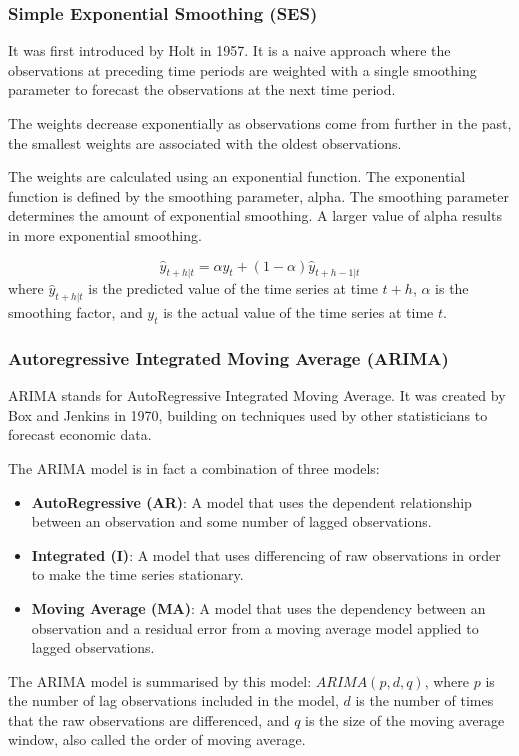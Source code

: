 \documentclass[manuscript,screen,nonacm,11pt]{acmart}
\numberwithin{equation}{section}
\begin{document}
\subsubsection{Simple Exponential Smoothing (SES)}
It was first introduced by Holt in 1957. It is a naive approach where the observations at
preceding time periods are weighted with a single smoothing parameter to forecast the
observations at the next time period.

The weights decrease exponentially as observations come from further in the past,
the smallest weights are associated with the oldest observations.

The weights are calculated using an exponential function. The exponential function is defined by
the smoothing parameter, alpha. The smoothing parameter determines the amount of exponential
smoothing. A larger value of alpha results in more exponential smoothing.

\begin{equation}
\label{eq:ses}
\hat{y}_{t+h|t} = \alpha y_t + (1-\alpha)\hat{y}_{t+h-1|t}
\end{equation}
where $\hat{y}_{t+h|t}$ is the predicted value of the time series at time $t+h$,
$\alpha$ is the smoothing factor, and $y_t$ is the actual value of the time series
at time $t$.

\subsubsection{Autoregressive Integrated Moving Average (ARIMA)}
ARIMA stands for AutoRegressive Integrated Moving Average. It was created by Box and Jenkins 
in 1970, building on techniques used by other statisticians to forecast economic data.

The ARIMA model is in fact a combination of three models:
\begin{itemize}
\item \textbf{AutoRegressive (AR)}: A model that uses the dependent relationship between an observation and some number of lagged observations.
\item \textbf{Integrated (I)}: A model that uses differencing of raw observations in order to make the time series stationary.
\item \textbf{Moving Average (MA)}: A model that uses the dependency between an observation and a residual error from a moving average model applied to lagged observations.
\end{itemize} 

The ARIMA model is summarised by this model: $ARIMA(p,d,q)$, where $p$ is the number of lag observations included in the model, $d$ is the number of times that the raw observations are differenced, and $q$ is the size of the moving average window, also called the order of moving average.
\end{document}
